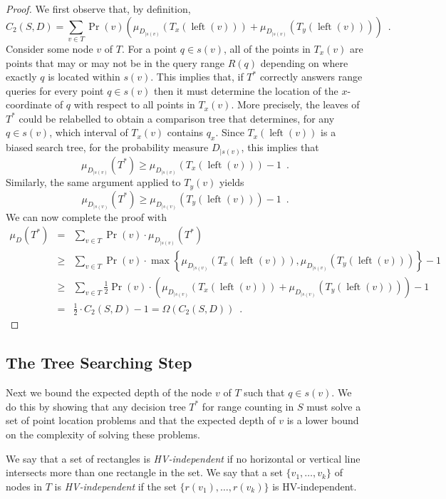 \documentclass[lotsofwhite,charterfonts]{patmorin}
\DeclareMathOperator{\lft}{left}
\begin{document}
\begin{proof}
We first observe that, by definition,
\[
  C_2(S,D) =  \sum_{v\in T} 
              \Pr(v)\left( \mu_{D_{\mid s(v)}}(T_x(\lft(v)))
                               +  \mu_{D_{\mid s(v)}}(T_y(\lft(v))) \right)
           \enspace .
\]
Consider some node $v$ of $T$.  For a point $q\in s(v)$, all of the
points in $T_x(v)$ are points that may or may not be in the query
range $R(q)$ depending on where exactly $q$ is located within $s(v)$.
This implies that, if $T^*$ correctly answers range queries for every
point $q\in s(v)$ then it must determine the location of the
$x$-coordinate of $q$ with respect to all points in $T_x(v)$.  More
precisely, the leaves of $T^*$ could be relabelled to obtain a
comparison tree that determines, for any $q\in s(v)$, which interval
of $T_x(v)$ contains $q_x$.  Since $T_x(\lft(v))$ is a biased search tree,
for the probability measure $D_{\mid s(v)}$, this implies that
\[
  \mu_{D_{\mid s(v)}}(T^*) \ge \mu_{D_{\mid s(v)}}(T_x(\lft(v))) - 1\enspace .
\]
Similarly, the same argument applied to $T_y(v)$ yields 
\[
  \mu_{D_{\mid s(v)}}(T^*) \ge \mu_{D_{\mid s(v)}}(T_y(\lft(v))) - 1\enspace .
\]
We can now complete the proof with
\begin{eqnarray*}
\mu_D(T^*) 
 & = & \sum_{v\in T} \Pr(v)\cdot\mu_{D_{\mid s(v)}}(T^*) \\
 & \ge & \sum_{v\in T}
	\Pr(v) \cdot\max\left\{\mu_{D_{\mid s(v)}}(T_x(\lft(v))), 
		       \mu_{D_{\mid s(v)}}(T_y(\lft(v)))\right\} - 1 \\
 & \ge & \sum_{v\in T}
	\frac{1}{2}\Pr(v)\cdot\left( \mu_{D_{\mid s(v)}}(T_x(\lft(v)))
                             +  \mu_{D_{\mid s(v)}}(T_y(\lft(v))) \right) - 1 \\
 & = & \frac{1}{2}\cdot C_2(S,D) - 1 = \Omega(C_2(S,D)) \enspace .
\end{eqnarray*}
\end{proof}

\subsection{The Tree Searching Step}

Next we bound the expected depth of the node $v$ of $T$ such that
$q\in s(v)$.  We do this by showing that any decision tree $T^*$ for
range counting in $S$ must solve a set of point location problems and
that the expected depth of $v$ is a lower bound on the complexity of
solving these problems.

We say that a set of rectangles is \emph{HV-independent} if no
horizontal or vertical line intersects more than one rectangle in the
set.  We say that a set $\{v_1,\ldots,v_k\}$ of nodes in $T$ is
\emph{HV-independent} if the set $\{r(v_1),\ldots,r(v_k)\}$ is
HV-independent.
\end{document}
